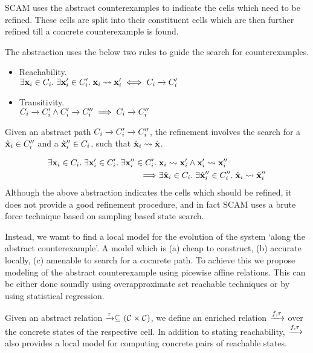 SCAM uses the abstract counterexamples to indicate the cells which
need to be refined. These cells are split into their constituent cells
which are then further refined till a concrete counterexample is
found.

The abstraction uses the below two rules to guide the search for
counterexamples.
\begin{itemize}
    \item Reachability.\\
        $\exists \mathbf{x}_i \in C_i.\; \exists \mathbf{x}'_i \in C'_i.\;
        \mathbf{x}_i \overset{}{\rightsquigarrow} \mathbf{x}'_i \iff C_i \xrightarrow{} C'_i$

    \item Transitivity.\\
        $C_i \xrightarrow{} C'_i \wedge C'_i \xrightarrow{} C''_i \implies C_i \xrightarrow{} C''_i$
\end{itemize}
Given an abstract path $C_i\xrightarrow{}C'_i\xrightarrow{}C''_i$, the
refinement involves the search for a $\hat{\mathbf{x}}_i \in C''_i$ and a
$\hat{\mathbf{x}}''_i \in C_i$, such that $\hat{\mathbf{x}}_i \overset{}{\rightsquigarrow} \hat{\mathbf{x}}$.

\begin{align*}
    \exists \mathbf{x}_i \in C_i.\; \exists \mathbf{x}'_i \in C'_i.\; \exists \mathbf{x}''_i
    \in C'_i.\;  &\mathbf{x}_i \overset{}{\rightsquigarrow} \mathbf{x}'_i \wedge \mathbf{x}'_i \overset{}{\rightsquigarrow} \mathbf{x}''_i\\
    \implies &\exists \hat{\mathbf{x}}_i \in C_i.\; \exists \hat{\mathbf{x}}''_i
    \in C''_i.\; \hat{\mathbf{x}}_i \overset{}{\rightsquigarrow} \hat{\mathbf{x}}''_i
\end{align*}
Although the above abstraction indicates the cells which should be
refined, it does not provide a good refinement procedure, and in fact
SCAM uses a brute force technique based on sampling based state search.

Instead, we wamt to find a local model for the evolution of the system
`along the abstract counterexample'. A model which is (a) cheap to
construct, (b) accurate locally, (c) amenable to search for a cocnrete
path. To achieve this we propose modeling of the abstract
counterexample using picewise affine relations. This can be either
done soundly using overapproximate set reachable techniques or by
using statistical regression.

Given an abstract relation $\xrightarrow{\tau}\subseteq(\mathcal{C} \times \mathcal{C})$, we
define an enriched relation $\xrightarrow{f_{}, \tau}$ over the concrete
states of the respective cell. In addition to stating reachability,
$\xrightarrow{f_{}, \tau}$ also provides a local model for computing
concrete pairs of reachable states.

